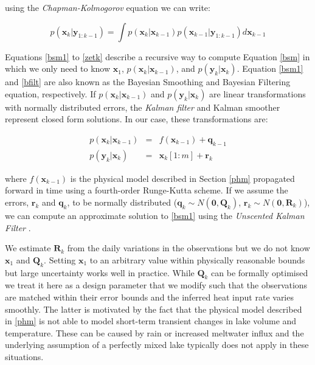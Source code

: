 \documentclass{bmc_template/bmcart}
\newcommand{\bm}[1]{{\textbf{#1}}}
\begin{document}
using the \textit{Chapman-Kolmogorov} equation
\cite{sarkkaBayesianFilteringSmoothing2013} we can write:

\begin{equation}
p(\bm{x}_k|\bm{y}_{1:k-1}) = \int p(\bm{x}_k|\bm{x}_{k-1})p(\bm{x}_{k-1}|\bm{y}_{1:k-1})d\bm{x}_{k-1} 
\end{equation}

Equations \ref{bsm1} to \ref{zetk} describe a recursive way to compute Equation
\ref{bsm} in which we only need to know $\bm{x}_1$,
$p(\bm{x}_k|\bm{x}_{k-1})$, and $p(\bm{y}_k|\bm{x}_k)$. Equation \ref{bsm1} and
\ref{bfilt} are also known as the Bayesian Smoothing and Bayesian Filtering
equation, respectively. If $p(\bm{x}_k|\bm{x}_{k-1})$ and
$p(\bm{y}_k|\bm{x}_k)$ are linear transformations with normally distributed
errors, the \textit{Kalman filter} \cite{Kalman1960} and Kalman smoother
\cite{Rauch1965} represent closed form solutions. In our case, these
transformations are:

\begin{eqnarray}
p(\bm{x}_k|\bm{x}_{k-1}) & = & f(\bm{x}_{k-1}) + \bm{q}_{k-1} \\
    p(\bm{y}_k|\bm{x}_k) & = & \bm{x}_k[1:m] + \bm{r}_k   
\end{eqnarray}

where $f(\bm{x}_{k-1})$ is the physical model described in Section \ref{phm}
propagated forward in time using a fourth-order Runge-Kutta scheme. If we 
assume the errors, $\bm{r}_k$ and $\bm{q}_{k}$, to be normally distributed
($\bm{q}_{k} \sim N(\bm{0},
\bm{Q}_{k})$, $\bm{r}_k \sim N(\bm{0}, \bm{R}_k)$), we can compute an
approximate solution to \ref{bsm1} using the \textit{Unscented Kalman Filter}
\citep{Merwe2004, sarkkaBayesianFilteringSmoothing2013}.

We estimate $\bm{R}_k$ from the daily variations in the observations but we do
not know $\bm{x}_1$ and $\bm{Q}_{k}$. Setting $\bm{x}_1$ to an arbitrary value
within physically reasonable bounds but large uncertainty works well in
practice. While $\bm{Q}_{k}$ can be formally optimised we treat it here as a
design parameter that we modify such that the observations are matched within
their error bounds and the inferred heat input rate varies smoothly. The latter
is motivated by the fact that the physical model described in \ref{phm} is not
able to model short-term transient changes in lake volume and temperature. These
can be caused by rain or increased meltwater influx and the underlying
assumption of a perfectly mixed lake typically does not apply in these
situations.
\end{document}
